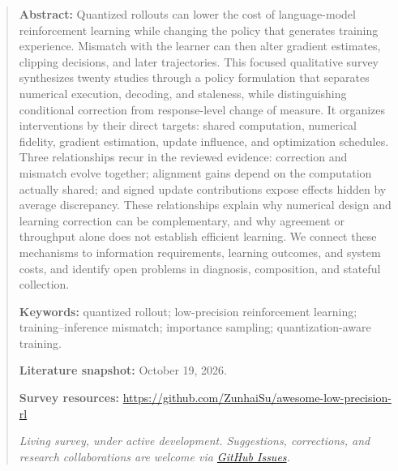 \begin{abstract}
\textbf{Abstract:} 
Quantized rollouts can lower the cost of language-model reinforcement learning while changing the policy that generates training experience. Mismatch with the learner can then alter gradient estimates, clipping decisions, and later trajectories. This focused qualitative survey synthesizes twenty studies through a policy formulation that separates numerical execution, decoding, and staleness, while distinguishing conditional correction from response-level change of measure. It organizes interventions by their direct targets: shared computation, numerical fidelity, gradient estimation, update influence, and optimization schedules. Three relationships recur in the reviewed evidence: correction and mismatch evolve together; alignment gains depend on the computation actually shared; and signed update contributions expose effects hidden by average discrepancy. These relationships explain why numerical design and learning correction can be complementary, and why agreement or throughput alone does not establish efficient learning. We connect these mechanisms to information requirements, learning outcomes, and system costs, and identify open problems in diagnosis, composition, and stateful collection.
\par\medskip
\noindent\textbf{Keywords:} quantized rollout; low-precision reinforcement learning; training--inference mismatch; importance sampling; quantization-aware training.
\par\medskip\textbf{Literature snapshot:} October 19, 2026.
\par\medskip\noindent\textbf{Survey resources:} \url{https://github.com/ZunhaiSu/awesome-low-precision-rl}
\par\smallskip\noindent\textit{Living survey, under active development. Suggestions, corrections, and research collaborations are welcome via \href{https://github.com/ZunhaiSu/awesome-low-precision-rl/issues}{GitHub Issues}.}
\end{abstract}
\maketitle\thispagestyle{empty}
